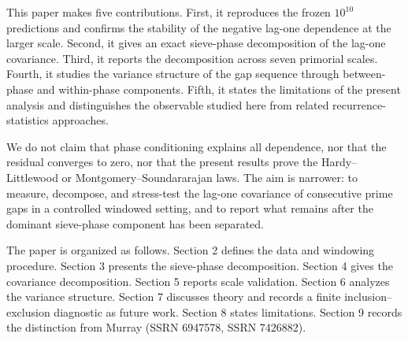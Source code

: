 This paper makes five contributions. First, it reproduces the frozen $10^{10}$ predictions and confirms the stability of the negative lag-one dependence at the larger scale. Second, it gives an exact sieve-phase decomposition of the lag-one covariance. Third, it reports the decomposition across seven primorial scales. Fourth, it studies the variance structure of the gap sequence through between-phase and within-phase components. Fifth, it states the limitations of the present analysis and distinguishes the observable studied here from related recurrence-statistics approaches.

We do not claim that phase conditioning explains all dependence, nor that the residual converges to zero, nor that the present results prove the Hardy--Littlewood or Montgomery--Soundararajan laws. The aim is narrower: to measure, decompose, and stress-test the lag-one covariance of consecutive prime gaps in a controlled windowed setting, and to report what remains after the dominant sieve-phase component has been separated.

The paper is organized as follows. Section 2 defines the data and windowing procedure. Section 3 presents the sieve-phase decomposition. Section 4 gives the covariance decomposition. Section 5 reports scale validation. Section 6 analyzes the variance structure. Section 7 discusses theory and records a finite inclusion--exclusion diagnostic as future work. Section 8 states limitations. Section 9 records the distinction from Murray (SSRN 6947578, SSRN 7426882).
